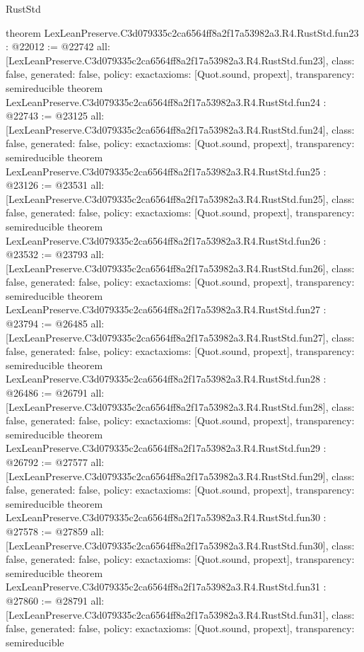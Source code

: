 \begin{lexlean}{RustStd}
\begin{coremodule}
{}
theorem LexLeanPreserve.C3d079335c2ca6564ff8a2f17a53982a3.R4.RustStd.fun23 : @22012 := @22742 {
  all: [LexLeanPreserve.C3d079335c2ca6564ff8a2f17a53982a3.R4.RustStd.fun23],
  class: false,
  generated: false,
  policy: exact{axioms: [Quot.sound, propext]},
  transparency: semireducible
}
theorem LexLeanPreserve.C3d079335c2ca6564ff8a2f17a53982a3.R4.RustStd.fun24 : @22743 := @23125 {
  all: [LexLeanPreserve.C3d079335c2ca6564ff8a2f17a53982a3.R4.RustStd.fun24],
  class: false,
  generated: false,
  policy: exact{axioms: [Quot.sound, propext]},
  transparency: semireducible
}
theorem LexLeanPreserve.C3d079335c2ca6564ff8a2f17a53982a3.R4.RustStd.fun25 : @23126 := @23531 {
  all: [LexLeanPreserve.C3d079335c2ca6564ff8a2f17a53982a3.R4.RustStd.fun25],
  class: false,
  generated: false,
  policy: exact{axioms: [Quot.sound, propext]},
  transparency: semireducible
}
theorem LexLeanPreserve.C3d079335c2ca6564ff8a2f17a53982a3.R4.RustStd.fun26 : @23532 := @23793 {
  all: [LexLeanPreserve.C3d079335c2ca6564ff8a2f17a53982a3.R4.RustStd.fun26],
  class: false,
  generated: false,
  policy: exact{axioms: [Quot.sound, propext]},
  transparency: semireducible
}
theorem LexLeanPreserve.C3d079335c2ca6564ff8a2f17a53982a3.R4.RustStd.fun27 : @23794 := @26485 {
  all: [LexLeanPreserve.C3d079335c2ca6564ff8a2f17a53982a3.R4.RustStd.fun27],
  class: false,
  generated: false,
  policy: exact{axioms: [Quot.sound, propext]},
  transparency: semireducible
}
theorem LexLeanPreserve.C3d079335c2ca6564ff8a2f17a53982a3.R4.RustStd.fun28 : @26486 := @26791 {
  all: [LexLeanPreserve.C3d079335c2ca6564ff8a2f17a53982a3.R4.RustStd.fun28],
  class: false,
  generated: false,
  policy: exact{axioms: [Quot.sound, propext]},
  transparency: semireducible
}
theorem LexLeanPreserve.C3d079335c2ca6564ff8a2f17a53982a3.R4.RustStd.fun29 : @26792 := @27577 {
  all: [LexLeanPreserve.C3d079335c2ca6564ff8a2f17a53982a3.R4.RustStd.fun29],
  class: false,
  generated: false,
  policy: exact{axioms: [Quot.sound, propext]},
  transparency: semireducible
}
theorem LexLeanPreserve.C3d079335c2ca6564ff8a2f17a53982a3.R4.RustStd.fun30 : @27578 := @27859 {
  all: [LexLeanPreserve.C3d079335c2ca6564ff8a2f17a53982a3.R4.RustStd.fun30],
  class: false,
  generated: false,
  policy: exact{axioms: [Quot.sound, propext]},
  transparency: semireducible
}
theorem LexLeanPreserve.C3d079335c2ca6564ff8a2f17a53982a3.R4.RustStd.fun31 : @27860 := @28791 {
  all: [LexLeanPreserve.C3d079335c2ca6564ff8a2f17a53982a3.R4.RustStd.fun31],
  class: false,
  generated: false,
  policy: exact{axioms: [Quot.sound, propext]},
  transparency: semireducible
}
\end{coremodule}
\end{lexlean}
